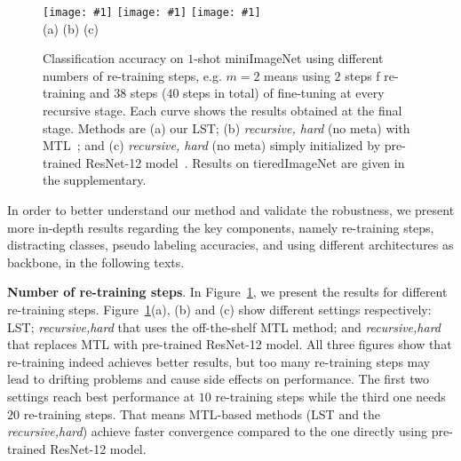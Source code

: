 \documentclass{article}
\newcommand{\myparagraph}[1]{\vspace{0.1em}\noindent\textbf{#1}}
\begin{document}
\begin{figure}
\newcommand{\plotexpone}[1]{\texttt{[image: \#1]}}
\plotexpone{plots/figure3a.eps}
\plotexpone{plots/figure3b.eps}
\plotexpone{plots/figure3c.eps}\\
\hspace*{2.31cm} (a) \hspace{4.18cm}(b) \hspace{4.18cm}(c)\\
\vspace{-0.5cm}
\caption{Classification accuracy on $1$-shot miniImageNet using different numbers of re-training steps, e.g. $m=2$ means using $2$ steps f re-training and $38$ steps ($40$ steps in total) of fine-tuning at every recursive stage. 
Each curve shows the results obtained at the final stage. Methods are (a) our LST; (b) \emph{recursive, hard} (no meta) with MTL~\cite{SunCVPR2019}; and (c) \emph{recursive, hard} (no meta) simply initialized by pre-trained ResNet-12 model~\cite{SunCVPR2019}. Results on tieredImageNet are given in the supplementary.
}
\vspace{-0.5cm}
\label{plot_experiment}
\end{figure} 
In order to better understand our method and validate the robustness, we present more in-depth results regarding the key components, namely re-training steps, distracting classes, pseudo labeling accuracies, and using different architectures as backbone, in the following texts.

\myparagraph{Number of re-training steps}. In Figure~\ref{plot_experiment}, we present the results for different re-training steps. Figure~\ref{plot_experiment}(a), (b) and (c) show different settings respectively: LST; \emph{recursive,hard} that uses the off-the-shelf MTL method; and \emph{recursive,hard} that replaces MTL with pre-trained ResNet-12 model.
All three figures show that re-training indeed achieves better results, but too many re-training steps may lead to drifting problems and cause side effects on performance. The first two settings reach best performance at $10$ re-training steps while the third one needs $20$ re-training steps. That means MTL-based methods (LST and the \emph{recursive,hard}) achieve faster convergence compared to the one directly using pre-trained ResNet-12 model.
\end{document}
